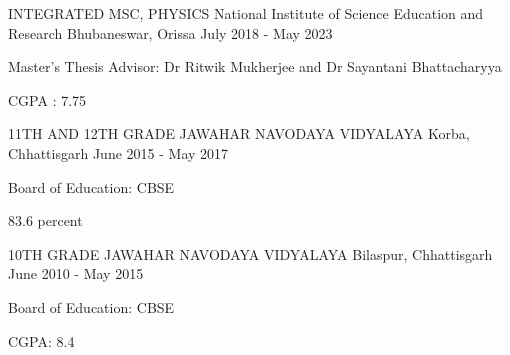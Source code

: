 

\begin{cventries}

  \cventry
    {INTEGRATED MSC, PHYSICS} %
    {National Institute of Science Education and Research} %
    {Bhubaneswar, Orissa} %
    {July 2018 - May 2023} %
    {
      \begin{cvitems} %
        \item {Master’s Thesis Advisor: Dr Ritwik Mukherjee and Dr Sayantani Bhattacharyya}
        \item {CGPA : 7.75}
      \end{cvitems}
    }

  \cventry
    {11TH AND 12TH GRADE} %
    {JAWAHAR NAVODAYA VIDYALAYA} %
    {Korba, Chhattisgarh} %
    {June 2015 - May 2017} %
    {
      \begin{cvitems} %
        \item {Board of Education: CBSE}
        \item83.6 percent 
      \end{cvitems}
    } %

  \cventry
    {10TH GRADE} %
    {JAWAHAR NAVODAYA VIDYALAYA} %
    {Bilaspur, Chhattisgarh} %
    {June 2010 - May 2015} %
    {
      \begin{cvitems} %
        \item {Board of Education: CBSE}
        \item CGPA: 8.4
      \end{cvitems}
    }

\end{cventries}
